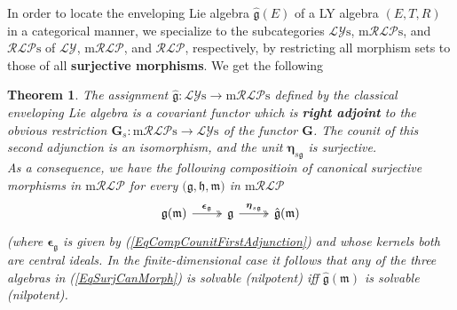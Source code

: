 \documentclass [11pt] {article}
\newtheorem {theorem} [lemma] {Theorem}
\theoremstyle{definition}
\begin{document}
\noindent In order to locate the enveloping Lie algebra $\hat{\mathfrak{g}}(E)$
of a LY algebra $(E,T,R)$ in a categorical manner, we specialize to the subcategories
$\mathcal{LY}\mathrm{s}$, $\mathrm{m}\mathcal{RLP}\mathrm{s}$, and
$\mathcal{RLP}\mathrm{s}$ of $\mathcal{LY}$, $\mathrm{m}\mathcal{RLP}$, and
$\mathcal{RLP}$, respectively, by restricting all morphism sets to those of all \textbf{surjective morphisms}. We get the following 
\begin{theorem}\label{TEnvLieAlgUniversal}
	The assignment $\hat{\mathfrak{g}}:\mathcal{LY}\mathrm{s}\to \mathrm{m}\mathcal{RLP}\mathrm{s}$ defined by the classical enveloping Lie algebra
	is a covariant functor which is \textbf{right adjoint} to the obvious restriction
	$\mathbf{G}_s:\mathrm{m}\mathcal{RLP}\mathrm{s}\to \mathcal{LY}\mathrm{s}$
	of the functor $\mathbf{G}$. The counit of this second adjunction is an isomorphism, and the unit $\boldsymbol{\eta}_{s\mathfrak{g}}$ is surjective.\\
	As a consequence, we have the following compositioin of canonical surjective morphisms 
	in $\mathrm{m}\mathcal{RLP}$ for every $\big(\mathfrak{g},\mathfrak{h},
	\mathfrak{m}\big)$ in $\mathrm{m}\mathcal{RLP}$
	\begin{equation}\label{EqSurjCanMorph}
		\begin{tikzcd}
		\mathfrak{g}(\mathfrak{m})
		  \arrow[r, twoheadrightarrow, "\boldsymbol{\epsilon}_\mathfrak{g}"]
		      &   \mathfrak{g}
		      	\arrow[r, twoheadrightarrow, "\boldsymbol{\eta}_{s\mathfrak{g}}"]
		      	&\hat{\mathfrak{g}}(\mathfrak{m})
		\end{tikzcd}
	\end{equation}
	(where $\boldsymbol{\epsilon}_\mathfrak{g}$ is given by (\ref{EqCompCounitFirstAdjunction}) and
	whose kernels both are central ideals. In the finite-dimensional case
	it follows that any of the three algebras in  (\ref{EqSurjCanMorph}) is
	solvable (nilpotent) iff $\hat{\mathfrak{g}}(\mathfrak{m})$ is solvable
	(nilpotent).
\end{theorem}
\end{document}
